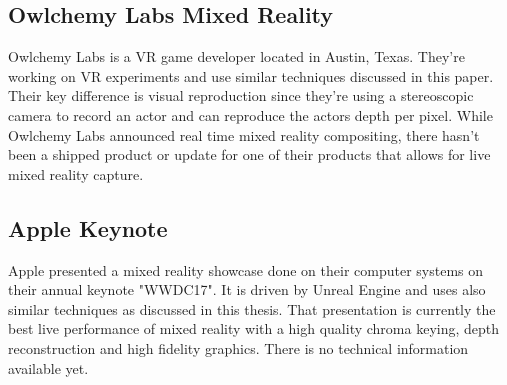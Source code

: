 \subsection{Owlchemy Labs Mixed Reality}

Owlchemy Labs is a VR game developer located in Austin, Texas. They're working 
on VR experiments and use similar techniques discussed in this paper. Their key 
difference is visual reproduction since they're using a stereoscopic camera to 
record an actor and can reproduce the actors depth per pixel.
\newline
While Owlchemy Labs announced real time mixed reality compositing, there hasn't 
been a shipped product or update for one of their products that allows for live 
mixed reality capture.

\subsection{Apple Keynote}

Apple presented a mixed reality showcase done on their computer systems on 
their annual keynote "WWDC17". It is driven by Unreal Engine and uses also 
similar techniques as discussed in this thesis. That presentation is currently 
the best live performance of mixed reality with a high quality chroma keying, 
depth reconstruction and high fidelity graphics. There is no technical 
information available yet.
